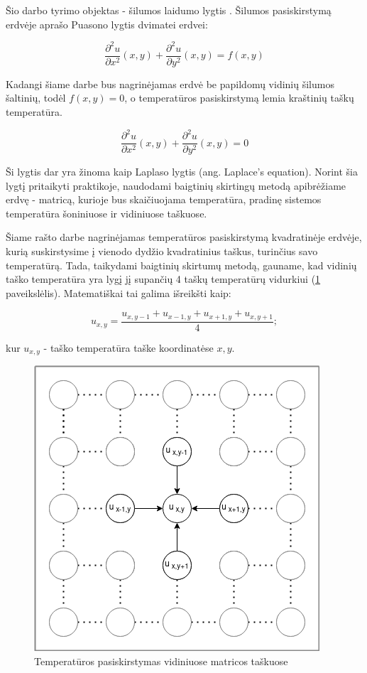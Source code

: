 \documentclass{VUMIFPSbakalaurinis}
\begin{document}
Šio darbo tyrimo objektas - šilumos laidumo lygtis \cite{burden2011numerical}. 
Šilumos pasiskirstymą erdvėje aprašo Puasono lygtis dvimatei erdvei:

\[ \frac{∂^2 u}{∂ x^2}(x,y)+\frac{∂^2 u}{∂ y^2}(x,y) = f(x,y) \]

Kadangi šiame darbe bus nagrinėjamas erdvė be papildomų vidinių šilumos šaltinių, todėl $f(x,y) = 0 $, o temperatūros pasiskirstymą lemia kraštinių taškų temperatūra.

\[ \frac{∂^2 u}{∂ x^2}(x,y)+\frac{∂^2 u}{∂ y^2}(x,y) = 0 \]

Ši lygtis dar yra žinoma kaip Laplaso lygtis (ang. Laplace's equation).
Norint šia lygtį pritaikyti praktikoje, naudodami baigtinių skirtingų metodą apibrėžiame erdvę - matricą, kurioje bus skaičiuojama temperatūra, pradinę sistemos temperatūra šoniniuose ir vidiniuose taškuose.

Šiame rašto darbe nagrinėjamas temperatūros pasiskirstymą kvadratinėje erdvėje, kurią suskirstysime į vienodo dydžio kvadratinius taškus, turinčius savo temperatūrą.
Tada, taikydami baigtinių skirtumų metodą, gauname, kad vidinių taško temperatūra yra lygį jį supančių 4 taškų temperatūrų vidurkiui (\ref{img:5point} paveikslėlis). 
Matematiškai tai galima išreikšti kaip:

\[ u_{x, y} = \frac{u_{x,y-1}+u_{x-1,y}+u_{x+1,y}+u_{x,y+1}}{4} ;\]

kur $u_{x,y}$ - taško temperatūra taške koordinatėse $x,y$.  

\begin{figure}[H]
    \centering
    \includegraphics[scale=0.7]{img/5point.png}
    \caption{Temperatūros pasiskirstymas vidiniuose matricos taškuose}
    \label{img:5point}
\end{figure}
\end{document}
